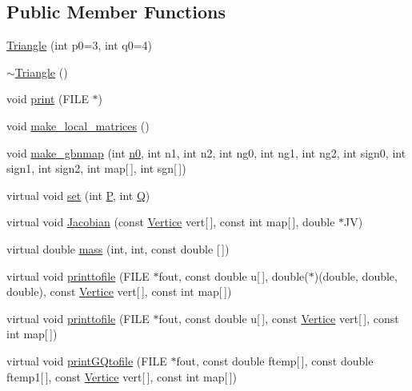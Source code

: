 \subsection*{Public Member Functions}
\begin{DoxyCompactItemize}
\item 
\hyperlink{classTriangle_a268f528f307fa58b426f5e08b4847adb}{Triangle} (int p0=3, int q0=4)
\item 
\hyperlink{classTriangle_a5199760a17454f4dc94c855a57e3a152}{$\sim$\+Triangle} ()
\item 
void \hyperlink{classTriangle_ad9159142cf526db5cf44035c62a1f927}{print} (F\+I\+LE $\ast$)
\item 
void \hyperlink{classTriangle_a0266527176e45c12a896110a8e5e20f8}{make\+\_\+local\+\_\+matrices} ()
\item 
void \hyperlink{classTriangle_a87bdc01aefd328ef819f0b2f8c6448dc}{make\+\_\+gbnmap} (int \hyperlink{DG__EI__Header_8h_a5f7b79d1f60dd1c85e99108c66052098}{n0}, int n1, int n2, int ng0, int ng1, int ng2, int sign0, int sign1, int sign2, int map\mbox{[}$\,$\mbox{]}, int sgn\mbox{[}$\,$\mbox{]})
\item 
virtual void \hyperlink{classTriangle_a51d0da1119ccde5c695ea4da980bda8d}{set} (int \hyperlink{classStdel_a05cbb3f2a3fa0bc04a74e347dc6574cf}{P}, int \hyperlink{classStdel_a82074e598ad5af5ec45a3257a3c2b684}{Q})
\item 
virtual void \hyperlink{classTriangle_a723405bf07d4123a417623114409b74e}{Jacobian} (const \hyperlink{structVertice}{Vertice} vert\mbox{[}$\,$\mbox{]}, const int map\mbox{[}$\,$\mbox{]}, double $\ast$JV)
\item 
virtual double \hyperlink{classTriangle_a6728c6239f7edbf04da7246cf0ee0c8c}{mass} (int, int, const double \mbox{[}$\,$\mbox{]})
\item 
virtual void \hyperlink{classTriangle_a404774b49104b12d072c9c103f9c357c}{printtofile} (F\+I\+LE $\ast$fout, const double u\mbox{[}$\,$\mbox{]}, double($\ast$)(double, double, double), const \hyperlink{structVertice}{Vertice} vert\mbox{[}$\,$\mbox{]}, const int map\mbox{[}$\,$\mbox{]})
\item 
virtual void \hyperlink{classTriangle_ab95679ba1b3e20ac9e585ffe409f7972}{printtofile} (F\+I\+LE $\ast$fout, const double u\mbox{[}$\,$\mbox{]}, const \hyperlink{structVertice}{Vertice} vert\mbox{[}$\,$\mbox{]}, const int map\mbox{[}$\,$\mbox{]})
\item 
virtual void \hyperlink{classTriangle_a0ab3ad47c3e5432601110f246dec7652}{print\+G\+Qtofile} (F\+I\+LE $\ast$fout, const double ftemp\mbox{[}$\,$\mbox{]}, const double ftemp1\mbox{[}$\,$\mbox{]}, const \hyperlink{structVertice}{Vertice} vert\mbox{[}$\,$\mbox{]}, const int map\mbox{[}$\,$\mbox{]})

\end{DoxyCompactItemize}
